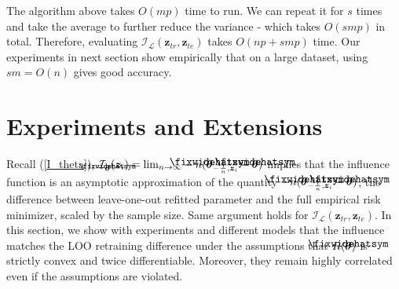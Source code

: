 \documentclass{article}
\newcommand\lowerwidehatsym{%
  \text{\smash{\raisebox{-1.3ex}{%
    $\fixwidehatsym$}}}}
\newcommand\fixwidehat[1]{%
  \mathchoice
    {\accentset{\displaystyle\lowerwidehatsym}{#1}}
    {\accentset{\textstyle\lowerwidehatsym}{#1}}
    {\accentset{\scriptstyle\lowerwidehatsym}{#1}}
    {\accentset{\scriptscriptstyle\lowerwidehatsym}{#1}}
}
\begin{document}
\vspace{-16pt}
The algorithm above takes $O(mp)$ time to run. We can repeat it for $s$ times and take the average to further reduce the variance - which takes $O(smp)$ in total. Therefore, evaluating $\mathcal{I}_{\mathcal{L}}(\bm{z}_{tr}, \bm{z}_{te})$ takes $O(np + smp)$ time. Our experiments in next section show empirically that on a large dataset, using $sm=O(n)$ gives good accuracy. 



\section{Experiments and Extensions}
Recall (\ref{I_theta}), $\mathcal{I}_{\fixwidehat{\bm{\theta}}}(\bm{z}_{i}) = {\lim}_{n \to \infty}-n(\fixwidehat{\bm{\theta}}_{-\frac{1}{n}, \bm{z}_i} - \fixwidehat{\bm{\theta}})$ implies that the influence function is an asymptotic approximation of the quantity $-n(\fixwidehat{\bm{\theta}}_{-\frac{1}{n}, \bm{z}_i} - \fixwidehat{\bm{\theta}})$, the difference between leave-one-out refitted parameter and the full empirical risk minimizer, scaled by the sample size. Same argument holds for $\mathcal{I}_{\mathcal{L}}(\bm{z}_{tr}, \bm{z}_{te})$. In this section, we show with experiments and different models that the influence matches the LOO retraining difference under the assumptions that $R(\fixwidehat{\bm{\theta}})$ is strictly convex and twice differentiable. Moreover, they remain highly correlated even if the assumptions are violated.
\end{document}
